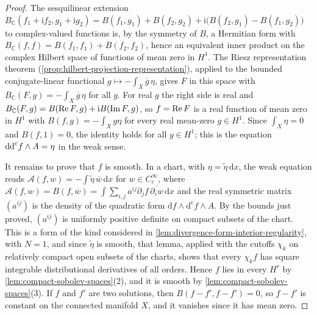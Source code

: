 \begin{proof}
The sesquilinear extension $B_{\mathbb C}(f_1+\mathrm if_2,g_1+\mathrm ig_2)=B(f_1,g_1)+B(f_2,g_2)+\mathrm i\bigl(B(f_2,g_1)-B(f_1,g_2)\bigr)$ to complex-valued functions is, by the symmetry of $B$, a Hermitian form with $B_{\mathbb C}(f,f)=B(f_1,f_1)+B(f_2,f_2)$, hence an equivalent inner product on the complex Hilbert space of functions of mean zero in $H^1$. The Riesz representation theorem (\cref{prop:hilbert-projection-representation}), applied to the bounded conjugate-linear functional $g\mapsto-\int_X\overline g\,\eta$, gives $F$ in this space with $B_{\mathbb C}(F,g)=-\int_X\overline g\,\eta$ for all $g$. For real $g$ the right side is real and $B_{\mathbb C}(F,g)=B(\operatorname{Re} F,g)+\mathrm iB(\operatorname{Im} F,g)$, so $f=\operatorname{Re} F$ is a real function of mean zero in $H^1$ with $B(f,g)=-\int_Xg\eta$ for every real mean-zero $g\in H^1$. Since $\int_X\eta=0$ and $B(f,1)=0$, the identity holds for all $g\in H^1$; this is the equation $\mathrm{dd}^{\mathrm{c}} f\wedge A=\eta$ in the weak sense.

It remains to prove that $f$ is smooth. In a chart, with $\eta=\tilde\eta\,\mathrm dx$, the weak equation reads $\mathcal A(f,w)=-\int\tilde\eta\,\overline w\,\mathrm dx$ for $w\in C^\infty_c$, where $\mathcal A(f,w)=B(f,\overline w)=\int\sum_{i,j}a^{ij}\partial_jf\,\overline{\partial_iw}\,\mathrm dx$ and the real symmetric matrix $(a^{ij})$ is the density of the quadratic form $\mathrm df\wedge\mathrm d^{\mathrm c}f\wedge A$. By the bounds just proved, $(a^{ij})$ is uniformly positive definite on compact subsets of the chart. This is a form of the kind considered in \cref{lem:divergence-form-interior-regularity}, with $N=1$, and since $\tilde\eta$ is smooth, that lemma, applied with the cutoffs $\chi_k$ on relatively compact open subsets of the charts, shows that every $\chi_kf$ has square integrable distributional derivatives of all orders. Hence $f$ lies in every $H^r$ by \cref{lem:compact-sobolev-spaces}(2), and it is smooth by \cref{lem:compact-sobolev-spaces}(3). If $f$ and $f'$ are two solutions, then $B(f-f',f-f')=0$, so $f-f'$ is constant on the connected manifold $X$, and it vanishes since it has mean zero.
\end{proof}

